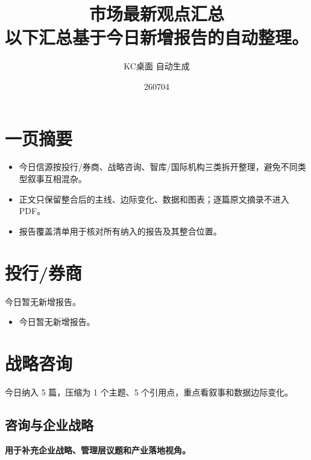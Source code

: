 \documentclass[11pt]{ctexart}
\title{\textbf{市场最新观点汇总}\\[0.4em]{\large 以下汇总基于今日新增报告的自动整理。}}
\author{KC桌面 自动生成}
\date{260704}
\begin{document}
\maketitle
\tableofcontents
\newpage
\section{一页摘要}
\begin{itemize}
  \item 今日信源按投行/券商、战略咨询、智库/国际机构三类拆开整理，避免不同类型叙事互相混杂。
  \item 正文只保留整合后的主线、边际变化、数据和图表；逐篇原文摘录不进入 PDF。
  \item 报告覆盖清单用于核对所有纳入的报告及其整合位置。
\end{itemize}
\section{投行/券商}
今日暂无新增报告。

\begin{itemize}
  \item 今日暂无新增报告。
\end{itemize}
\section{战略咨询}
今日纳入 5 篇，压缩为 1 个主题、5 个引用点，重点看叙事和数据边际变化。

\subsection{咨询与企业战略}
\textbf{用于补充企业战略、管理层议题和产业落地视角。}
\end{document}
